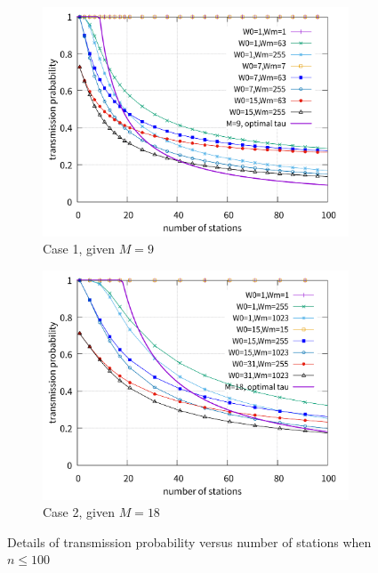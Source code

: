 \documentclass[journal]{IEEEtran}
\begin{document}
\begin{figure}[!t]
\centering
\begin{subfigure}{0.5\textwidth}
\centering
\includegraphics[scale=.38]{./figure/Section_perf_eval/tau/n_tau_perf_M9_x100.pdf}
\caption{Case 1, given $M=9$}
\label{fig_tau_n_M9_detail}
\end{subfigure}

\begin{subfigure}{0.5\textwidth}
\centering
\includegraphics[scale=.38]{./figure/Section_perf_eval/tau/n_tau_perf_M18_x100.pdf}
\caption{Case 2, given $M=18$}
\label{fig_tau_n_M18_detail}
\end{subfigure}

\caption{Details of transmission probability versus number of stations when $n\leq 100$}
\label{fig_tau_n_detail}
\end{figure}
\end{document}
